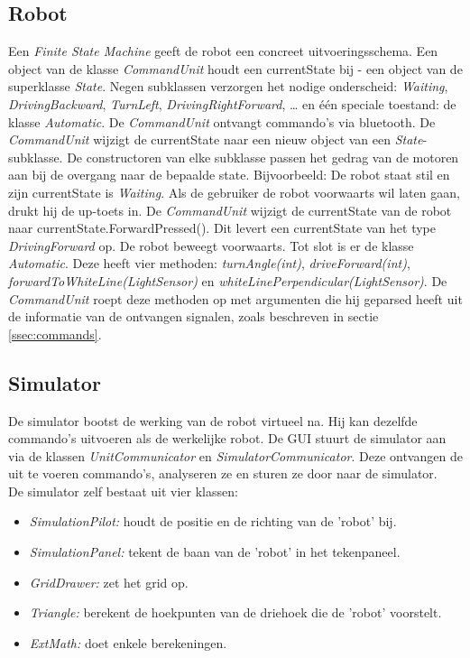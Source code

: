 \documentclass[tt3]{penoverslag}
\begin{document}
\subsection{Robot} %
\label{ssec:robot}
Een \textit{Finite State Machine} geeft de robot een concreet uitvoeringsschema. Een object van de klasse \textit{CommandUnit} houdt een currentState bij - een object van de superklasse \textit{State}. Negen subklassen verzorgen het nodige onderscheid: \textit{Waiting}, \textit{DrivingBackward}, \textit{TurnLeft}, \textit{DrivingRightForward}, …  en \'e\'en speciale toestand: de klasse \textit{Automatic}. De \textit{CommandUnit} ontvangt commando's via bluetooth. De \textit{CommandUnit} wijzigt de currentState naar een nieuw object van een \textit{State}-subklasse. De constructoren van elke subklasse passen het gedrag van de motoren aan bij de overgang naar de bepaalde state.
Bijvoorbeeld: De robot staat stil en zijn currentState is \textit{Waiting}.
Als de gebruiker de robot voorwaarts wil laten gaan, drukt hij de up-toets in. De \textit{CommandUnit} wijzigt de currentState van de robot naar currentState.ForwardPressed(). Dit levert een currentState van het type \textit{DrivingForward} op. De robot beweegt voorwaarts.
Tot slot is er de klasse \textit{Automatic}. Deze heeft vier methoden: \textit{turnAngle(int)}, \textit{driveForward(int)}, \textit{forwardToWhiteLine(LightSensor)} en \textit{whiteLinePerpendicular(LightSensor)}. De \textit{CommandUnit} roept deze methoden op met argumenten die hij geparsed heeft uit de informatie van de ontvangen signalen, zoals beschreven in sectie \ref{ssec:commands}.

\subsection{Simulator} %
\label{ssec:simulator}
De simulator bootst de werking van de robot virtueel na. Hij kan dezelfde commando's uitvoeren als de werkelijke robot. De GUI stuurt de simulator aan via de klassen \textit{UnitCommunicator} en \textit{SimulatorCommunicator}. Deze ontvangen de uit te voeren commando's, analyseren ze en sturen ze door naar de simulator.
\\
De simulator zelf bestaat uit vier klassen:

\begin{itemize}
\item \textit{SimulationPilot:} houdt de positie en de richting van de 'robot' bij.
\item \textit{SimulationPanel:} tekent de baan van de 'robot' in het tekenpaneel.
\item \textit{GridDrawer:} zet het grid op.
\item \textit{Triangle:} berekent de hoekpunten van de driehoek die de 'robot' voorstelt.
\item \textit{ExtMath:} doet enkele berekeningen.
\end{itemize}
\end{document}
